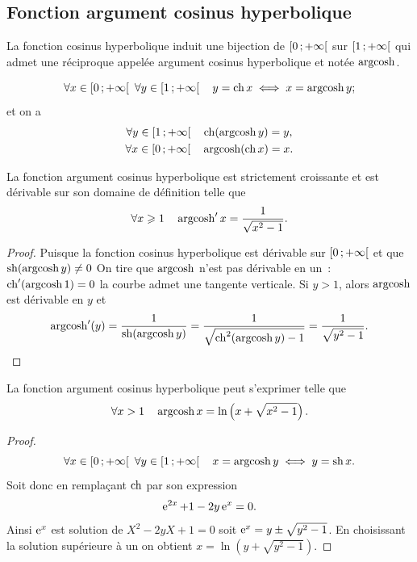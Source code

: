 \subsection{Fonction argument cosinus hyperbolique}
\label{subsec:chap1-fonctionargcosh}
\begin{defdef}
  La fonction cosinus hyperbolique induit une bijection de \(\left[ 0 \, ;  +\infty \right[\) sur \(\left[ 1 \, ;  +\infty \right[\) qui admet une réciproque appelée argument cosinus hyperbolique et notée \(\operatorname{argcosh}\).
\end{defdef}
%
\begin{prop}
  \begin{equation}
    \forall x \in \left[ 0 \, ;  +\infty \right[ \ \forall y \in \left[ 1 \, ;  +\infty \right[ \quad y=\operatorname{ch} x \iff x = \operatorname{argcosh} y ;
  \end{equation}
  et on a
  \begin{gather}
    \forall y \in \left[ 1 \, ;  +\infty \right[ \quad \operatorname{ch}(\operatorname{argcosh} y) = y, \\
    \forall x \in \left[ 0 \, ;  +\infty \right[ \quad \operatorname{argcosh}(\operatorname{ch} x) = x.
  \end{gather}
\end{prop}
%
\begin{prop}
  La fonction argument cosinus hyperbolique est strictement croissante et est dérivable sur son domaine de définition telle que
  \begin{equation}
    \forall x\geqslant{}1 \quad \operatorname{argcosh}' x =\frac{1}{\sqrt{x^2-1}}.
  \end{equation}
\end{prop}
\begin{proof}
  Puisque la fonction cosinus hyperbolique est dérivable sur \(\left[ 0 \, ;  +\infty \right[\) et que \(\operatorname{sh}(\operatorname{argcosh} y) \neq 0\) On tire que \(\operatorname{argcosh}\) n'est pas dérivable en un~: \(\operatorname{ch}'(\operatorname{argcosh} 1)=0\) la courbe admet une tangente verticale. Si \(y>1\), alors \(\operatorname{argcosh}\) est dérivable en \(y\) et
  \begin{equation}
    \operatorname{argcosh}'(y)=\frac{1}{\operatorname{sh}(\operatorname{argcosh} y)}=\frac{1}{\sqrt{\operatorname{ch}^2(\operatorname{argcosh} y)-1}}=\frac{1}{\sqrt{y^2-1}}.
  \end{equation}
\end{proof}
%
\begin{prop} La fonction argument cosinus hyperbolique peut s'exprimer telle que
  \begin{equation}
    \forall x>1 \quad \operatorname{argcosh} x = \ln \left(x +\sqrt{x^2-1}\right).
  \end{equation}
\end{prop}
\begin{proof}
  \begin{equation}
    \forall x \in \Rplus \ \forall y \in \intervallefo{1}{+\infty} \quad x=\argch y \iff y=\hsin x.
  \end{equation}
  Soit donc en remplaçant \(\operatorname{ch}\) par son expression
  \begin{equation}
    \operatorname{e}^{2x} +1 - 2y\operatorname{e}^x =0.
  \end{equation}
  Ainsi \(\operatorname{e}^x\) est solution de \(X^2-2yX+1=0\) soit \(\operatorname{e}^x = y \pm \sqrt{y^2-1}\). En choisissant la solution supérieure à un on obtient \(x=\ln \left(y+\sqrt{y^2-1} \right)\).
\end{proof}

